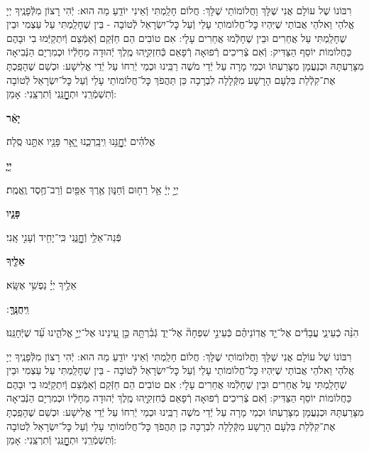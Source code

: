 \documentclass[twoside, openany, parskip=half, 11pt]{book}
\begin{document}
\\

רִבּוֹנוֹ שֶׁל עוֹלָם אֲנִי שֶׁלָּךְ וַחֲלוֹמוֹתַי שֶׁלָּךְ: חֲלוֹם חָלַֽמְתִּי וְֿאֵינִי יוֹדֵֽעַ מַה הוּא: יְֿהִי רָצוֹן מִלְּֿפָנֶֽיךָ יְיָ אֱלֹהַי וֵאלֹהֵי אֲבוֹתַי שֶׁיִּהְיוּ כׇּל־חֲלוֹמוֹתַי עָלַי וְֿעַל כׇּל־יִשְׂרָאֵל לְֿטוֹבָה - בֵּין שֶׁחָלַֽמְתִּי עַל עַצְמִי וּבֵין שֶׁחָלַֽמְתִּי עַל אֲחֵרִים וּבֵין שֶׁחָלְֿמוּ אֲחֵרִים עָלָי: אִם טוֹבִים הֵם חַזְּֿקֵם וְֿאַמְּֿצֵם וְֿיִתְקַיְּֿמוּ בִי וּבָהֶם כַּחֲלוֹמוֹת יוֹסֵף הַצַּדִּיק: וְֿאִם צְֿרִיכִים רְֿפוּאָה רְֿפָאֵם כְּֿחִזְקִיָּֽהוּ מֶֽלֶךְ יְֿהוּדָה מֵחָלְֿיוֹ וּכְמִרְיָם הַנְּֿבִיאָה מִצָּרַעְתָּהּ וּכְנַעֲמָן מִצָּרַעְתּוֹ וּכְמֵי מָרָה עַל יְֿדֵי מֹשֶׁה רַבֵּֽינוּ וּכְמֵי יְֿרִחוֹ עַל יְֿדֵי אֱלִישָׁע: וּכְשֵׁם שֶׁהָפַֽכְתָּ אֶת־קִלְֿלַת בִּלְעָם הָרָשָׁע מִקְּֿלָלָה לִבְרָכָה כֵּן תַּהֲפֹךְ כׇּל־חֲלוֹמוֹתַי עָלַי וְֿעַל כׇּל־יִשְׂרָאֵל לְֿטוֹבָה וְֿתִשְׁמְֿרֵֽנִי וּתְחׇׇׇׇׇׇׇׇׇׇָנֵּֽנִי וְֿתִרְצֵֽנִי: אָמֵן:



\textbf{יָאֵ֨ר}
\hfill \begin{footnotesize}
	אֱלֹהִ֗ים יְֿחׇׇׇׇׇׇׇׇָנֵּ֥נוּ וִֽיבָֽרְכֵ֑נוּ יָ֤אֵ֥ר פָּנָ֖יו אִתָּ֣נוּ סֶֽלָה׃\\
\end{footnotesize}
\textbf{יְיָ֧}
\hfill \begin{footnotesize}
	יְיָ֣ יְיָ֔ אֵ֥ל רַח֖וּם וְֿחַנּ֑וּן אֶ֥רֶךְ אַפַּ֖יִם וְֿרַב־חֶ֥סֶד וֶֽאֱמֶֽת׃\\
\end{footnotesize}
\textbf{פָּנָ֛יו}
\hfill \begin{footnotesize}
	פְּֿנֵה־אֵלַ֥י וְֿחׇׇׇׇׇׇׇׇׇׇָנֵּ֑נִי כִּֽי־יָחִ֖יד וְֿעָנִ֣י אָֽנִי׃\\
\end{footnotesize}
\textbf{אֵלֶ֖יךָ}
\hfill \begin{footnotesize}
	אֵלֶ֥יךָ יְיָ֗ נַפְשִׁ֥י אֶשָּֽׂא׃\\
\end{footnotesize}
\textbf{וִֽיחֻנֶּֽךָּ}
׃ \hfill \begin{footnotesize}
	הִנֵּ֨ה כְֿעֵינֵ֢י עֲבָדִ֡ים אֶל־יַ֤ד אֲדֽוֹנֵיהֶ֗ם כְּֿעֵינֵ֣י שִׁפְחָה֘ אֶל־יַד֢ גְּֿבִ֫רְתָּ֥הּ כֵּ֣ן עֵ֭ינֵינוּ אֶל־יְיָ֣ אֱלֹהֵ֑ינוּ עַ֝֗ד שֶׁיְּֿחָנֵּֽנוּ׃
\end{footnotesize}


רִבּוֹנוֹ שֶׁל עוֹלָם אֲנִי שֶׁלָּךְ וַחֲלוֹמוֹתַי שֶׁלָּךְ: חֲלוֹם חָלַֽמְתִּי וְֿאֵינִי יוֹדֵֽעַ מַה הוּא: יְֿהִי רָצוֹן מִלְּֿפָנֶֽיךָ יְיָ אֱלֹהַי וֵאלֹהֵי אֲבוֹתַי שֶׁיִּהְיוּ כׇּל־חֲלוֹמוֹתַי עָלַי וְֿעַל כׇּל־יִשְׂרָאֵל לְֿטוֹבָה - בֵּין שֶׁחָלַֽמְתִּי עַל עַצְמִי וּבֵין שֶׁחָלַֽמְתִּי עַל אֲחֵרִים וּבֵין שֶׁחָלְֿמוּ אֲחֵרִים עָלָי: אִם טוֹבִים הֵם חַזְּֿקֵם וְֿאַמְּֿצֵם וְֿיִתְקַיְּֿמוּ בִי וּבָהֶם כַּחֲלוֹמוֹת יוֹסֵף הַצַּדִּיק: וְֿאִם צְֿרִיכִים רְֿפוּאָה רְֿפָאֵם כְּֿחִזְקִיָּֽהוּ מֶֽלֶךְ יְֿהוּדָה מֵחָלְֿיוֹ וּכְמִרְיָם הַנְּֿבִיאָה מִצָּרַעְתָּהּ וּכְנַעֲמָן מִצָּרַעְתּוֹ וּכְמֵי מָרָה עַל יְֿדֵי מֹשֶׁה רַבֵּֽינוּ וּכְמֵי יְֿרִחוֹ עַל יְֿדֵי אֱלִישָׁע: וּכְשֵׁם שֶׁהָפַֽכְתָּ אֶת־קִלְֿלַת בִּלְעָם הָרָשָׁע מִקְּֿלָלָה לִבְרָכָה כֵּן תַּהֲפֹךְ כׇּל־חֲלוֹמוֹתַי עָלַי וְֿעַל כׇּל־יִשְׂרָאֵל לְֿטוֹבָה וְֿתִשְׁמְֿרֵֽנִי וּתְחׇׇׇׇׇׇׇׇׇׇָנֵּֽנִי וְֿתִרְצֵֽנִי: אָמֵן:
\end{document}
